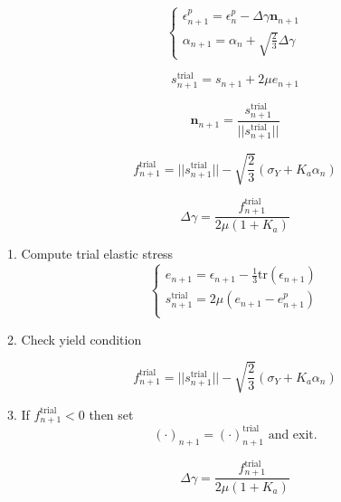 \documentclass[conference]{IEEEtran}
\begin{document}
\begin {equation}
\left\{
\begin{array}{ll}
\epsilon_{n+1}^{p} = \epsilon_{n}^{p} - \Delta \gamma  \mathbf{n}_{n+1} \\[5pt]
\alpha_{n+1} = \alpha_{n} + \sqrt{\frac{2}{3}} \Delta \gamma
\end{array}
\right.
\end {equation}

\begin {equation}
s_{n+1}^{\text{trial}} = s_{n+1} + 2 \mu e_{n+1}
\end {equation}

\begin {equation}
\mathbf{n}_{n+1} = \frac{s_{n+1}^{\text{trial}}}{|| s_{n+1}^{\text{trial}} ||}
\end {equation}

\begin {equation}
f_{n+1}^{\text{trial}} = || s_{n+1}^{\text{trial}} || - \sqrt{\frac{2}{3}} (\sigma_{Y} + K_{a} \alpha_{n} )
\end {equation}

\begin {equation}
\Delta \gamma = \frac{f_{n+1}^{\text{trial}}}{2\mu(1+K_{a})}
\end {equation}

1. Compute trial elastic stress
\begin {equation}
\left\{
\begin{array}{ll}
e_{n+1} = \epsilon_{n+1} - \frac{1}{3} \text{tr}( \epsilon_{n+1} ) \\[5pt]
s_{n+1}^{\text{trial}} = 2\mu( e_{n+1} - e_{n+1}^{p} ) \\[5pt]
\end{array}
\right.
\end {equation}

2. Check yield condition

\begin {equation}
f_{n+1}^{\text{trial}} = || s_{n+1}^{\text{trial}} || - \sqrt{\frac{2}{3}} (\sigma_{Y} + K_{a} \alpha_{n} )
\end {equation}

3. If $f_{n+1}^{\text{trial}} < 0$ then set
\begin {equation}
(\cdot)_{n+1} = (\cdot)_{n+1}^{\text{trial}} \text{ and exit.}
\end {equation}

\begin {equation}
\Delta \gamma = \frac{f_{n+1}^{\text{trial}}}{2\mu(1+K_{a})}
\end {equation}
\end{document}
